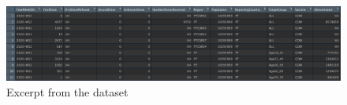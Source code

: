 \begin{figure}[h]
\centering %
\includegraphics[width=15cm]{images/dataset.png} 

\caption{Excerpt from the dataset }
\label{figura:qualquernome}
\end{figure}


